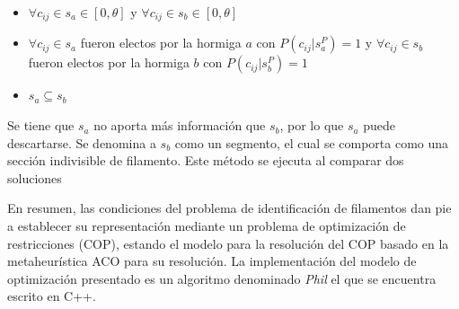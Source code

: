 \begin{itemize}
    \item $\forall c_{ij} \in s_a \in [0, \theta]$ y $\forall c_{ij} \in s_b \in [0, \theta]$
    \item $\forall c_{ij} \in s_a$ fueron electos por la hormiga $a$ con $P(c_{ij} | s_{a}^{P}) = 1$ y $\forall c_{ij} \in s_b$ fueron electos por la hormiga $b$ con $P(c_{ij} | s_{b}^{P}) = 1$
    \item $s_a \subseteq s_b$
\end{itemize}

Se tiene que $s_a$ no aporta m\'as informaci\'on que $s_b$, por lo que $s_a$ puede descartarse. Se denomina a $s_b$ como un segmento, el cual se comporta como una secci\'on indivisible de filamento. Este m\'etodo se ejecuta al comparar dos soluciones 



En resumen, las condiciones del problema de identificaci\'on de filamentos dan pie a establecer su representaci\'on mediante un problema de optimizaci\'on de restricciones (COP), estando el modelo para la resoluci\'on del COP basado en la metaheur\'istica ACO para su resoluci\'on. La implementaci\'on del modelo de optimizaci\'on presentado es un algoritmo denominado {\it Phil} el que se encuentra escrito en C++.